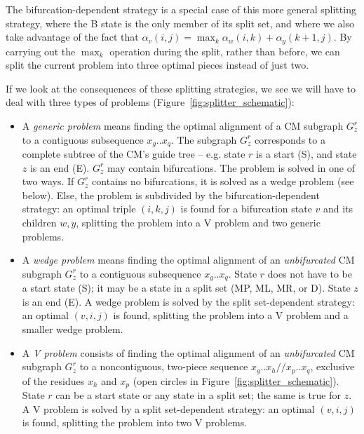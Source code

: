 \documentclass[11pt]{article}
\newif\ifdraft
\begin{document}
The bifurcation-dependent strategy is a special case of this more
general splitting strategy, where the B state is the only member of
its split set, and where we also take advantage of the fact that
$\alpha_v(i,j) = \max_k \alpha_w(i,k) + \alpha_y(k+1,j)$. By carrying
out the $\max_k$ operation during the split, rather than before, we
can split the current problem into three optimal pieces instead of
just two.

If we look at the consequences of these splitting strategies, we see
we will have to deal with three types of problems
(Figure~\ref{fig:splitter_schematic}):

\begin{itemize}
\item A \emph{generic problem} means finding the optimal alignment of
a CM subgraph $G^r_z$ to a contiguous subsequence $x_g..x_q$. The
subgraph $G^r_z$ corresponds to a complete subtree of the CM's
guide tree -- e.g. state $r$ is a start (S), and state $z$ is an end
(E). $G^r_z$ may contain bifurcations. The problem is solved in one
of two ways. If $G^r_z$ contains no bifurcations, it is solved as a
wedge problem (see below). Else, the problem is subdivided by the
bifurcation-dependent strategy: an optimal triple $(i,k,j)$ is found
for a bifurcation state $v$ and its children $w,y$, splitting the
problem into a V problem and two generic problems.

\item A \emph{wedge problem} means finding the optimal alignment of an
\emph{unbifurcated} CM subgraph $G^r_z$ to a contiguous subsequence
$x_g..x_q$. State $r$ does not have to be a start state (S); it may be
a state in a split set (MP, ML, MR, or D). State $z$ is an end (E).  A
wedge problem is solved by the split set-dependent strategy: an
optimal $(v,i,j)$ is found, splitting the problem into a V problem and
a smaller wedge problem.

\item A \emph{V problem} consists of finding the optimal alignment of
an \emph{unbifurcated} CM subgraph $G^r_z$ to a noncontiguous,
two-piece sequence $x_g..x_h//x_p..x_q$, exclusive of the residues
$x_h$ and $x_p$ (open circles in Figure~\ref{fig:splitter_schematic}).
State $r$ can be a start state or any state in a split set; the same
is true for $z$. A V problem is solved by a split set-dependent
strategy: an optimal $(v,i,j)$ is found, splitting the problem into
two V problems.
\end{itemize}

\ifdraft
\begin{figure}
\begin{center}
\texttt{[image: Figures/splitter\_schematic]}
\end{center}
\caption{\textbf{The three types of problems that need to be split.}
The sequence axis (e.g. $x_g..x_q$) is horizontal. The model subgraph
axis for a contiguous set of states (e.g. states $r..z$) is vertical,
where a solid lines means an unbifurcated model subgraph, and a dashed
line means a model subgraph that may contain bifurcations.  Closed
circles indicate ``inclusive of'', and open circles indicate
``exclusive of''.}
\label{fig:splitter_schematic}
\end{figure}
\fi
\end{document}
